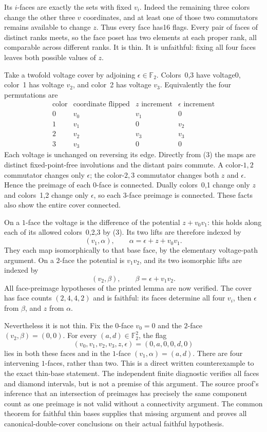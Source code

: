 \documentclass[a4paper,11pt]{article}
\begin{document}
Its $i$-faces are exactly the sets with fixed $v_i$. Indeed the remaining
three colors change the other three $v$ coordinates, and at least one
of those two commutators remains available to change $z$. Thus every
face has16 flags. Every pair of faces of distinct ranks meets, so the
face poset has two elements at each proper rank, all comparable across
different ranks. It is thin. It is unfaithful: fixing all four faces
leaves both possible values of $z$.

Take a twofold voltage cover by adjoining $\epsilon\in\mathbb F_2$.
Colors~0,3 have voltage0, color~1 has voltage $v_2$, and color~2 has
voltage $v_3$. Equivalently the four permutations are
\[
\begin{array}{c|c|c|c}
\text{color}&\text{coordinate flipped}&z\text{ increment}&\epsilon\text{ increment}\\\hline
0&v_0&v_1&0\\
1&v_1&0&v_2\\
2&v_2&v_3&v_3\\
3&v_3&0&0
\end{array}                                                   \tag{3}
\]
Each voltage is unchanged on reversing its edge. Directly from (3) the
maps are distinct fixed-point-free involutions and the distant pairs
commute. A color-$1,2$ commutator changes only $\epsilon$; the
color-$2,3$ commutator changes both $z$ and $\epsilon$. Hence the preimage
of each $0$-face is connected. Dually colors~0,1 change only $z$ and
colors~1,2 change only $\epsilon$, so each $3$-face preimage is connected.
These facts also show the entire cover connected.

On a $1$-face the voltage is the difference of the potential
$z+v_0v_1$: this holds along each of its allowed colors~0,2,3 by (3).
Its two lifts are therefore indexed by
\[
(v_1,\alpha),\qquad \alpha=\epsilon+z+v_0v_1.
\]
They each map isomorphically to that base face, by the elementary
voltage-path argument. On a $2$-face the potential is $v_1v_2$, and
its two isomorphic lifts are indexed by
\[
(v_2,\beta),\qquad \beta=\epsilon+v_1v_2.
\]
All face-preimage hypotheses of the printed lemma are now verified.
The cover has face counts $(2,4,4,2)$ and is faithful: its faces determine
all four $v_i$, then $\epsilon$ from $\beta$, and $z$ from $\alpha$.

Nevertheless it is not thin. Fix the $0$-face $v_0=0$ and the $2$-face
$(v_2,\beta)=(0,0)$. For every $(a,d)\in\mathbb F_2^2$, the flag
\[
(v_0,v_1,v_2,v_3,z,\epsilon)=(0,a,0,0,d,0)
\]
lies in both these faces and in the $1$-face $(v_1,\alpha)=(a,d)$.
There are four intervening $1$-faces, rather than two. This is a direct
written counterexample to the exact thin-base statement. The independent
finite diagnostic verifies all faces and diamond intervals, but is not
a premise of this argument. The source proof's inference that an
intersection of preimages has precisely the same component count as
one preimage is not valid without a connectivity argument. The common theorem for
faithful thin bases supplies that missing argument and proves all
canonical-double-cover conclusions on their actual faithful hypothesis.
\end{document}
